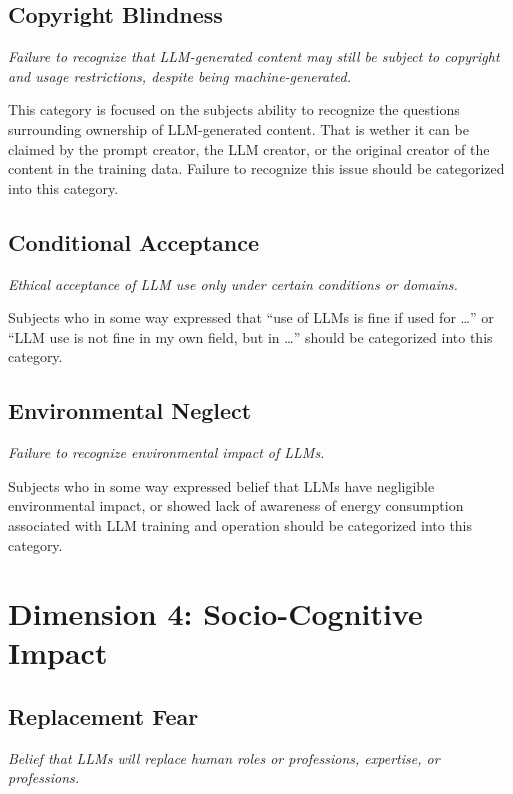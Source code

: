 \subsection*{Copyright Blindness}

\textit{Failure to recognize that LLM-generated content may still be subject to copyright and usage restrictions, despite being machine-generated.}

This category is focused on the subjects ability to recognize the questions surrounding ownership of LLM-generated content. That is wether it can be claimed by the prompt creator, the LLM creator, or the original creator of the content in the training data. Failure to recognize this issue should be categorized into this category.

\subsection*{Conditional Acceptance}

\textit{Ethical acceptance of LLM use only under certain conditions or domains.}

Subjects who in some way expressed that ``use of LLMs is fine if used for \ldots'' or ``LLM use is not fine in my own field, but in \ldots'' should be categorized into this category.

\subsection*{Environmental Neglect}

\textit{Failure to recognize environmental impact of LLMs.}

Subjects who in some way expressed belief that LLMs have negligible environmental impact, or showed lack of awareness of energy consumption associated with LLM training and operation should be categorized into this category.

\section*{Dimension 4: Socio-Cognitive Impact}

\subsection*{Replacement Fear}

\textit{Belief that LLMs will replace human roles or professions, expertise, or professions.}

